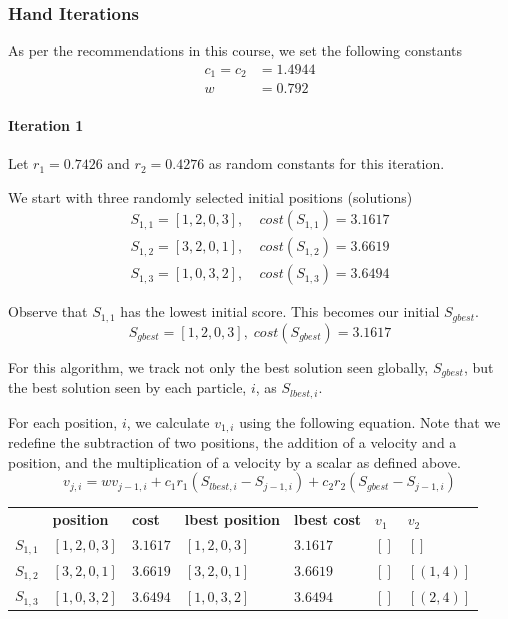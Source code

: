 \documentclass[a4paper]{article}
\newcommand{\subsubsubsection}[1]{\paragraph{#1} \mbox{}}
\begin{document}
\subsubsection{Hand Iterations}

As per the recommendations in this course, we set the following constants
\begin{align*}
c_1 = c_2 & = 1.4944 \\
w & = 0.792
\end{align*}

\subsubsubsection{Iteration 1}

Let $r_1 = 0.7426$ and $r_2 = 0.4276$ as random constants for this iteration.

We start with three randomly selected initial positions (solutions)
\begin{align*}
S_{1,1} = [1, 2, 0, 3], & \; cost(S_{1,1}) = 3.1617 \\
S_{1,2} = [3, 2, 0, 1], & \; cost(S_{1,2}) = 3.6619 \\
S_{1,3} = [1, 0, 3, 2], & \; cost(S_{1,3}) = 3.6494
\end{align*}

Observe that $S_{1,1}$ has the lowest initial score. This becomes our initial $S_\mathit{gbest}$.
$$S_\mathit{gbest} = [1, 2, 0, 3], \; cost(S_\mathit{gbest}) = 3.1617$$

For this algorithm, we track not only the best solution seen globally,
$S_\mathit{gbest}$, but the best solution seen by each particle, $i$, as
$S_{\mathit{lbest}, i}$.

For each position, $i$, we calculate
$v_{1,i}$ using the following equation. Note that we redefine the subtraction of
two positions, the addition of a velocity and a position, and the multiplication
of a velocity by a scalar as defined above\cite{DiscretePSO}.
$$
v_{j,i} =
  w v_{j-1, i} +
  c_1 r_1 (S_{\mathit{lbest}, i} - S_{j-1, i}) +
  c_2 r_2 (S_\mathit{gbest} - S_{j-1, i})
$$

\begin{center}
\begin{tabular}{lllllll}
          & \textbf{position} & \textbf{cost} & \textbf{lbest position} & \textbf{lbest cost} & $v_1$ & $v_2$            \\
$S_{1,1}$ & $[1, 2, 0, 3]$    & $3.1617$      & $[1, 2, 0, 3]$          & $3.1617$            & $[]$  & $[]      $ \\
$S_{1,2}$ & $[3, 2, 0, 1]$    & $3.6619$      & $[3, 2, 0, 1]$          & $3.6619$            & $[]$  & $[(1, 4)]$ \\
$S_{1,3}$ & $[1, 0, 3, 2]$    & $3.6494$      & $[1, 0, 3, 2]$          & $3.6494$            & $[]$  & $[(2, 4)]$ \\
\end{tabular}
\end{center}
\vspace{1.5em}
\end{document}
